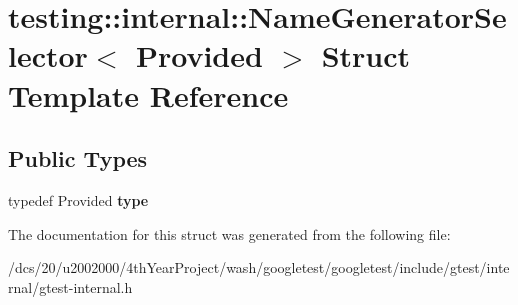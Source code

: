 \hypertarget{structtesting_1_1internal_1_1NameGeneratorSelector}{}\section{testing\+:\+:internal\+:\+:Name\+Generator\+Selector$<$ Provided $>$ Struct Template Reference}
\label{structtesting_1_1internal_1_1NameGeneratorSelector}
\subsection*{Public Types}
\begin{DoxyCompactItemize}
\item 
\mbox{\label{structtesting_1_1internal_1_1NameGeneratorSelector_af733dd040c8239a488f8a7f131a3d8e2}} 
typedef Provided {\bfseries type}
\end{DoxyCompactItemize}


The documentation for this struct was generated from the following file\+:\begin{DoxyCompactItemize}
\item 
/dcs/20/u2002000/4th\+Year\+Project/wash/googletest/googletest/include/gtest/internal/gtest-\/internal.\+h\end{DoxyCompactItemize}
